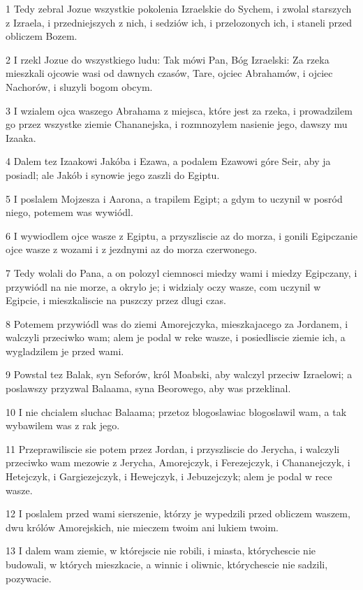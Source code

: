 \par 1 Tedy zebral Jozue wszystkie pokolenia Izraelskie do Sychem, i zwolal starszych z Izraela, i przedniejszych z nich, i sedziów ich, i przelozonych ich, i staneli przed obliczem Bozem.
\par 2 I rzekl Jozue do wszystkiego ludu: Tak mówi Pan, Bóg Izraelski: Za rzeka mieszkali ojcowie wasi od dawnych czasów, Tare, ojciec Abrahamów, i ojciec Nachorów, i sluzyli bogom obcym.
\par 3 I wzialem ojca waszego Abrahama z miejsca, które jest za rzeka, i prowadzilem go przez wszystke ziemie Chananejska, i rozmnozylem nasienie jego, dawszy mu Izaaka.
\par 4 Dalem tez Izaakowi Jakóba i Ezawa, a podalem Ezawowi góre Seir, aby ja posiadl; ale Jakób i synowie jego zaszli do Egiptu.
\par 5 I poslalem Mojzesza i Aarona, a trapilem Egipt; a gdym to uczynil w posród niego, potemem was wywiódl.
\par 6 I wywiodlem ojce wasze z Egiptu, a przyszliscie az do morza, i gonili Egipczanie ojce wasze z wozami i z jezdnymi az do morza czerwonego.
\par 7 Tedy wolali do Pana, a on polozyl ciemnosci miedzy wami i miedzy Egipczany, i przywiódl na nie morze, a okrylo je; i widzialy oczy wasze, com uczynil w Egipcie, i mieszkaliscie na puszczy przez dlugi czas.
\par 8 Potemem przywiódl was do ziemi Amorejczyka, mieszkajacego za Jordanem, i walczyli przeciwko wam; alem je podal w reke wasze, i posiedliscie ziemie ich, a wygladzilem je przed wami.
\par 9 Powstal tez Balak, syn Seforów, król Moabski, aby walczyl przeciw Izraelowi; a poslawszy przyzwal Balaama, syna Beorowego, aby was przeklinal.
\par 10 I nie chcialem sluchac Balaama; przetoz blogoslawiac blogoslawil wam, a tak wybawilem was z rak jego.
\par 11 Przeprawiliscie sie potem przez Jordan, i przyszliscie do Jerycha, i walczyli przeciwko wam mezowie z Jerycha, Amorejczyk, i Ferezejczyk, i Chananejczyk, i Hetejczyk, i Gargiezejczyk, i Hewejczyk, i Jebuzejczyk; alem je podal w rece wasze.
\par 12 I poslalem przed wami sierszenie, którzy je wypedzili przed obliczem waszem, dwu królów Amorejskich, nie mieczem twoim ani lukiem twoim.
\par 13 I dalem wam ziemie, w którejscie nie robili, i miasta, którychescie nie budowali, w których mieszkacie, a winnic i oliwnic, którychescie nie sadzili, pozywacie.
